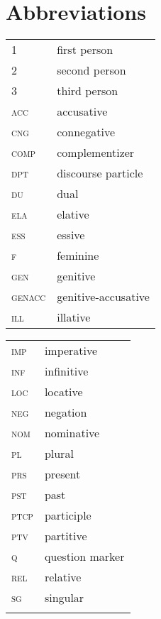 \documentclass[output=paper]{LSP/langsci}
\begin{document}
\section*{Abbreviations}
\begin{tabularx}{.45\textwidth}{lQ}
1 & first  person\\
2 & second  person\\
3 & third  person\\
\textsc{acc} & accusative\\
\textsc{cng} & connegative\\
\textsc{comp} & complementizer\\
\textsc{dpt} & discourse  particle\\
\textsc{du} & dual\\
\textsc{ela} & elative\\
\textsc{ess} & essive\\
\textsc{f} & feminine\\
\textsc{gen} & genitive\\
\textsc{genacc} & genitive-accusative\\
\textsc{ill} & illative\\
\end{tabularx}
\begin{tabularx}{.45\textwidth}{lQ}
\textsc{imp} & imperative\\
\textsc{inf} & infinitive\\
\textsc{loc} & locative\\
\textsc{neg} & negation\\
\textsc{nom} & nominative\\
\textsc{pl} & plural\\
\textsc{prs} & present\\
\textsc{pst} & past\\
\textsc{ptcp} & participle\\
\textsc{ptv} & partitive\\
\textsc{q} & question  marker\\
\textsc{rel} & relative\\
\textsc{sg} & singular\\
\\
\end{tabularx}


{\sloppy
\printbibliography[heading=subbibliography,notkeyword=this] 
}
\end{document}

